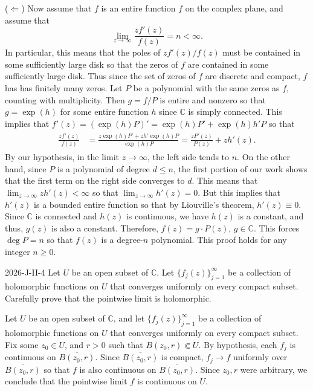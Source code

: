 \documentclass{article}
\begin{document}
	($\Longleftarrow$) Now assume that $f$ is an entire function $f$ on the complex plane, and assume that
	\begin{equation*}
		\lim_{z \to \infty}\frac{zf'(z)}{f(z)} = n < \infty. 
	\end{equation*}
	In particular, this means that the poles of $zf'(z)/f(z)$ must be contained in some sufficiently large disk so that the zeros of $f$ are contained in some sufficiently large disk. Thus since the set of zeros of $f$ are discrete and compact, $f$ has has finitely many zeros. Let $P$ be a polynomial with the same zeros as $f$, counting with multiplicity. Then $g = f/P$ is entire and nonzero so that $g = \exp(h)$ for some entire function $h$ since $\mathbb{C}$ is simply connected. This implies that $f'(z) = (\exp(h)P)' = \exp(h)P' + \exp(h)h'P$ so that 
	\begin{align*}
		\begin{split}
			\frac{zf'(z)}{f(z)} &= \frac{z\exp(h)P' + zh' \exp(h)P}{\exp(h)P} = \frac{zP'(z)}{P(z)} + zh'(z). 
		\end{split}
	\end{align*}
	By our hypothesis, in the limit $z \to \infty$, the left side tends to $n$. On the other hand, since $P$ is a polynomial of degree $d \leq n$, the first portion of our work shows that the first term on the right side converges to $d$. This means that $\lim_{z \to \infty}zh'(z) < \infty$ so that $\lim_{z \to \infty}h'(z) = 0$. But this implies that $h'(z)$ is a bounded entire function so that by Liouville's theorem, $h'(z) \equiv 0$. Since $\mathbb{C}$ is connected and $h(z)$ is continuous, we have $h(z)$ is a constant, and thus, $g(z)$ is also a constant. Therefore, $f(z) = g \cdot P(z)$, $g \in \mathbb{C}$. This forces $\deg{P} = n$ so that $f(z)$ is a degree-$n$ polynomial. This proof holds for any integer $n \geq 0$. 
	
	\begin{prb}{2026-J-II-4}
		Let $U$ be an open subset of $\mathbb{C}$. Let $\{f_{j}(z)\}_{j = 1}^{\infty}$ be a collection of holomorphic functions on $U$ that converges uniformly on every compact subset. Carefully prove that the pointwise limit is holomorphic. 
	\end{prb}
	Let $U$ be an open subset of $\mathbb{C}$, and let $\{f_{j}(z)\}_{j = 1}^{\infty}$ be a collection of holomorphic functions on $U$ that converges uniformly on every compact subset. Fix some $z_{0} \in U$, and $r > 0$ such that $B(z_{0}, r) \Subset U$. By hypothesis, each $f_{j}$ is continuous on $\overline{B(z_{0}, r)}$. Since $\overline{B(z_{0}, r)}$ is compact, $f_{j}\to f$ uniformly over $\overline{B(z_{0}, r)}$ so that $f$ is also continuous on $\overline{B(z_{0}, r)}$. Since $z_{0}, r$ were arbitrary, we conclude that the pointwise limit $f$ is continuous on $U$. 
	
\end{document}
